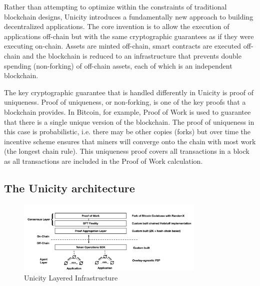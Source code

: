 \documentclass{article}
\begin{document}
Rather than attempting to optimize within the constraints of traditional blockchain designs, Unicity introduces a fundamentally new approach to building decentralized applications. The core invention is to allow the execution of applications off-chain but with the same cryptographic guarantees as if they were executing on-chain. Assets are minted off-chain, smart contracts are executed off-chain and the blockchain is reduced to an infrastructure that prevents double spending (non-forking) of off-chain assets, each of which is an independent blockchain. 


The key cryptographic guarantee that is handled differently in Unicity is proof of uniqueness. Proof of uniqueness, or non-forking, is one of the key proofs that a blockchain provides. In Bitcoin, for example, Proof of Work is used to guarantee that there is a single unique version of the blockchain. The proof of uniqueness in this case is probabilistic, i.e. there may be other copies (forks) but over time the incentive scheme ensures that miners will converge onto the chain with most work (the longest chain rule). This uniqueness proof covers all transactions in a block as all transactions are included in the Proof of Work calculation.



\subsection{The Unicity architecture}

\begin{figure}[htbp]
    \centering
    \includegraphics[width=0.8\textwidth]{FullStack.png}
    \caption{Unicity Layered Infrastructure}
    \label{fig:layers}
\end{figure}
\end{document}
